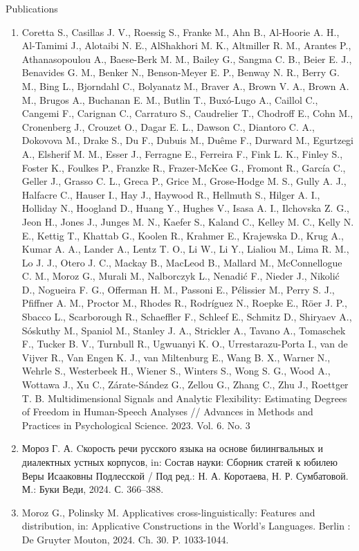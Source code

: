 \documentclass{resume} %
\begin{document}
\begin{rSection}{Publications}
\begin{enumerate}
\item Coretta S., Casillas J. V., Roessig S., Franke M., Ahn B., Al-Hoorie A. H., Al-Tamimi J., Alotaibi N. E., AlShakhori M. K., Altmiller R. M., Arantes P., Athanasopoulou A., Baese-Berk M. M., Bailey G., Sangma C. B., Beier E. J., Benavides G. M., Benker N., Benson-Meyer E. P., Benway N. R., Berry G. M., Bing L., Bjorndahl C., Bolyanatz M., Braver A., Brown V. A., Brown A. M., Brugos A., Buchanan E. M., Butlin T., Buxó-Lugo A., Caillol C., Cangemi F., Carignan C., Carraturo S., Caudrelier T., Chodroff E., Cohn M., Cronenberg J., Crouzet O., Dagar E. L., Dawson C., Diantoro C. A., Dokovova M., Drake S., Du F., Dubuis M., Duême F., Durward M., Egurtzegi A., Elsherif M. M., Esser J., Ferragne E., Ferreira F., Fink L. K., Finley S., Foster K., Foulkes P., Franzke R., Frazer-McKee G., Fromont R., García C., Geller J., Grasso C. L., Greca P., Grice M., Grose-Hodge M. S., Gully A. J., Halfacre C., Hauser I., Hay J., Haywood R., Hellmuth S., Hilger A. I., Holliday N., Hoogland D., Huang Y., Hughes V., Isasa A. I., Ilchovska Z. G., Jeon H., Jones J., Junges M. N., Kaefer S., Kaland C., Kelley M. C., Kelly N. E., Kettig T., Khattab G., Koolen R., Krahmer E., Krajewska D., Krug A., Kumar A. A., Lander A., Lentz T. O., Li W., Li Y., Lialiou M., Lima R. M., Lo J. J., Otero J. C., Mackay B., MacLeod B., Mallard M., McConnellogue C. M., Moroz G., Murali M., Nalborczyk L., Nenadić F., Nieder J., Nikolić D., Nogueira F. G., Offerman H. M., Passoni E., Pélissier M., Perry S. J., Pfiffner A. M., Proctor M., Rhodes R., Rodríguez N., Roepke E., Röer J. P., Sbacco L., Scarborough R., Schaeffler F., Schleef E., Schmitz D., Shiryaev A., Sóskuthy M., Spaniol M., Stanley J. A., Strickler A., Tavano A., Tomaschek F., Tucker B. V., Turnbull R., Ugwuanyi K. O., Urrestarazu-Porta I., van de Vijver R., Van Engen K. J., van Miltenburg E., Wang B. X., Warner N., Wehrle S., Westerbeek H., Wiener S., Winters S., Wong S. G., Wood A., Wottawa J., Xu C., Zárate-Sández G., Zellou G., Zhang C., Zhu J., Roettger T. B. Multidimensional Signals and Analytic Flexibility: Estimating Degrees of Freedom in Human-Speech Analyses // Advances in Methods and Practices in Psychological Science. 2023. Vol. 6. No. 3
\item Мороз Г. А. Cкорость речи русского языка на основе билингвальных и диалектных устных корпусов, in: Состав науки: Сборник статей к юбилею Веры Исааковны Подлесской / Под ред.: Н. А. Коротаева, Н. Р. Сумбатовой. М.: Буки Веди, 2024. С. 366--388.
\item Moroz G., Polinsky M. Applicatives cross-linguistically: Features and distribution, in: Applicative Constructions in the World's Languages. Berlin : De Gruyter Mouton, 2024. Ch. 30. P. 1033-1044.

\end{enumerate}
\end{rSection}
\end{document}
